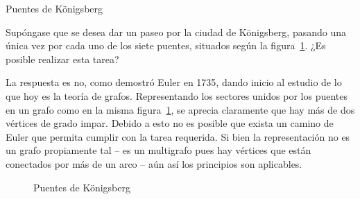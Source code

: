   \begin{example}
    Puentes de \foreignlanguage{german}{Königsberg}

    Supóngase que se desea dar un paseo
    por la ciudad de \foreignlanguage{german}{Königsberg},
    pasando una única vez por cada uno de los siete puentes,
    situados según la figura~\ref{fig:puentes}.
    ¿Es posible realizar esta tarea?

    La respuesta es no,
    como demostró Euler en 1735,%
    dando inicio al estudio de lo que hoy es la teoría de grafos.
    Representando los sectores unidos por los puentes en un grafo
    como en la misma figura~\ref{fig:puentes},
    se aprecia claramente
    que hay más de dos vértices de grado impar.
    Debido a esto no es posible que exista un camino de Euler
    que permita cumplir con la tarea requerida.
    Si bien la representación no es un grafo propiamente tal%
    -- es un multigrafo
	pues hay vértices que están conectados por más de un arco --
    aún así los principios son aplicables.
    \begin{figure}[htbp]
      \centering
      \hspace*{1.5em}%
      \hspace*{2.5em}%
      \caption[Puentes de Königsberg]
	      {Puentes de Königsberg~%
		 \cite{oconnor00:_koenigsberg_bridges}}
      \label{fig:puentes}
    \end{figure}
  \end{example}

